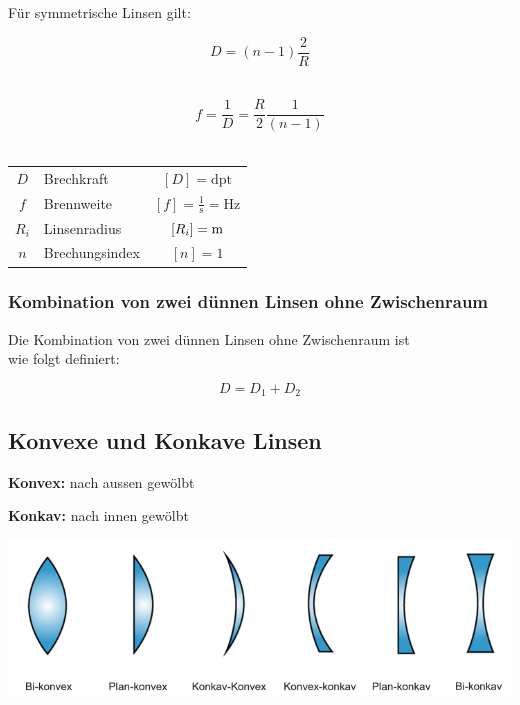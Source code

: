 Für symmetrische Linsen gilt:

\begin{minipage}{0.48\linewidth}
$$\boxed{D = (n - 1)\frac{2}{R}}$$ \\
\end{minipage}
\hfill
\begin{minipage}{0.48\linewidth}
$$\boxed{f = \frac{1}{D} = \frac{R}{2}\frac{1}{(n - 1)}} $$ \\
\end{minipage}



\begin{tabular}{c l c}
	$D$ & Brechkraft & $[D] = \mathrm{dpt}$ \\
	$f$ & Brennweite & $[f] = \mathrm{\frac{1}{s} = Hz}$ \\
	$R_i$ & Linsenradius & $[R_i] = \mathrm{m}$ \\
	$n$ & Brechungsindex & $[n] = 1$ \\
\end{tabular}





\subsubsection{Kombination von zwei dünnen Linsen ohne Zwischenraum}

Die Kombination von zwei dünnen Linsen ohne Zwischenraum ist \\
wie folgt definiert:

$$ \boxed{D = D_1 + D_2} $$




\subsection{Konvexe und Konkave Linsen}

\textbf{Konvex:} nach aussen gewölbt

\textbf{Konkav:} nach innen gewölbt

\includegraphics[width=0.9\linewidth]{Bilder/Wellen-Optik/Konvex}



